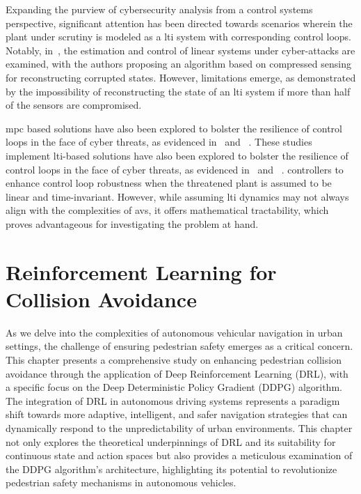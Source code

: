 Expanding the purview of cybersecurity analysis from a control systems perspective, significant attention has been directed towards scenarios wherein the plant under scrutiny is modeled as a \gls{lti} system with corresponding control loops. Notably, in~\cite{attack_1}, the estimation and control of linear systems under cyber-attacks are examined, with the authors proposing an algorithm based on compressed sensing for reconstructing corrupted states. However, limitations emerge, as demonstrated by the impossibility of reconstructing the state of an \gls{lti} system if more than half of the sensors are compromised.

\gls{mpc} based solutions have also been explored to bolster the resilience of control loops in the face of cyber threats, as evidenced in~\cite{attack_3}  and~\cite{attack_4} . These studies implement \gls{lti}-based solutions have also been explored to bolster the resilience of control loops in the face of cyber threats, as evidenced in~\cite{attack_3}  and~\cite{attack_4} .  controllers to enhance control loop robustness when the threatened plant is assumed to be linear and time-invariant. However, while assuming \gls{lti} dynamics may not always align with the complexities of  \glspl{av}, it offers mathematical tractability, which proves advantageous for investigating the problem at hand.

\chapter{Reinforcement Learning for Collision Avoidance}
\label{Chapter:3}

As we delve into the complexities of autonomous vehicular navigation in urban settings, the challenge of ensuring pedestrian safety emerges as a critical concern. This chapter presents a comprehensive study on enhancing pedestrian collision avoidance through the application of Deep Reinforcement Learning (DRL), with a specific focus on the Deep Deterministic Policy Gradient (DDPG) algorithm. The integration of DRL in autonomous driving systems represents a paradigm shift towards more adaptive, intelligent, and safer navigation strategies that can dynamically respond to the unpredictability of urban environments. This chapter not only explores the theoretical underpinnings of DRL and its suitability for continuous state and action spaces but also provides a meticulous examination of the DDPG algorithm's architecture, highlighting its potential to revolutionize pedestrian safety mechanisms in autonomous vehicles.

